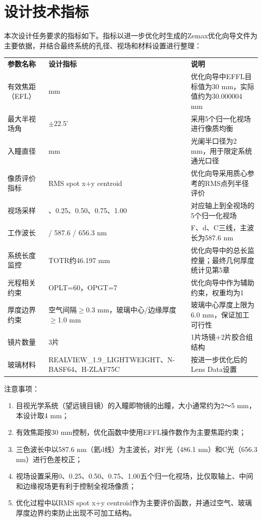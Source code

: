 \section{设计技术指标}

本次设计任务要求的指标如下。指标以进一步优化时生成的Zemax优化向导文件为主要依据，并结合最终系统的孔径、视场和材料设置进行整理：

\begin{longtable}[]{@{}
  >{\raggedright\arraybackslash}p{}
  >{\raggedright\arraybackslash}p{}
  >{\raggedright\arraybackslash}p{}@{}}
\toprule\noalign{}
\endhead
\bottomrule\noalign{}
\endlastfoot
\textbf{参数名称} & \textbf{设计指标} & \textbf{说明} \\
有效焦距（EFL） & 30 mm & 优化向导中EFFL目标值为30 mm，实际值约为30.000004 mm \\
最大半视场角 & \(\pm 22.5^\circ\) & 采用5个归一化视场进行像质均衡 \\
入瞳直径 & 4 mm & 光阑半口径为2 mm，用于限定系统通光口径 \\
像质评价指标 & RMS spot x+y centroid & 优化向导采用质心参考的RMS点列半径评价 \\
视场采样 & 0、0.25、0.50、0.75、1.00 & 对应轴上到全视场的5个归一化视场 \\
工作波长 & 486.1 / 587.6 / 656.3 nm & F、d、C三线，主波长为587.6 nm \\
系统长度监控 & TOTR约46.197 mm & 优化向导中的总长监控量；最终几何厚度统计见第5章 \\
光程相关约束 & OPLT=60，OPGT=7 & 优化向导中作为辅助约束，权重均为1 \\
厚度边界约束 & 空气间隔\(\ge\)0.3 mm，玻璃中心/边缘厚度\(\ge\)1.0 mm & 玻璃中心厚度上限为6.0 mm，保证加工可行性 \\
镜片数量 & 3片 & 1片场镜+2片胶合组结构 \\
玻璃材料 & REALVIEW\_1.9\_\newline LIGHTWEIGHT、\newline N-BASF64、H-ZLAF75C & 按进一步优化后的Lens Data设置 \\
\end{longtable}

注意事项：

\begin{enumerate}
\def\labelenumi{\arabic{enumi}.}
\item
  目视光学系统（望远镜目镜）的入瞳即物镜的出瞳，大小通常约为2～5 mm，本设计取4 mm；
\item
  有效焦距按30 mm控制，优化函数中使用EFFL操作数作为主要焦距约束；
\item
  三色波长中以587.6 nm（氦d线）为主波长，对F光（486.1 nm）和C光（656.3 nm）进行色差校正；
\item
  视场设置采用0、0.25、0.50、0.75、1.00五个归一化视场，比仅取轴上、中间和边缘视场更有利于控制全视场像质；
\item
  优化过程中以RMS spot x+y centroid作为主要评价函数，并通过空气、玻璃厚度边界约束防止出现不可加工结构。
\end{enumerate}
